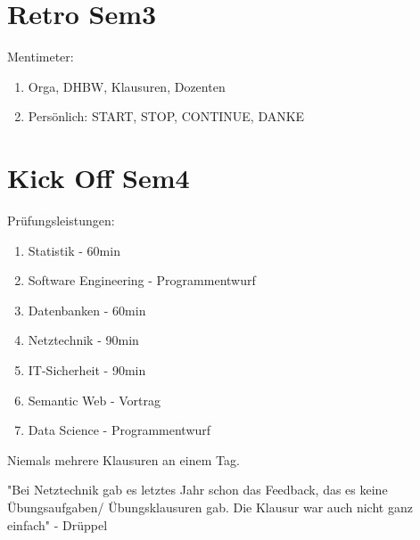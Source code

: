 \documentclass[a4paper]{article}
\title{\docTitle}
\author{Moritz}
\date{\today}
\begin{document}
\maketitle
\tableofcontents


\section{Retro Sem3}

Mentimeter:

\begin{enumerate}
    \item Orga, DHBW, Klausuren, Dozenten
    \item Persönlich: START, STOP, CONTINUE, DANKE
\end{enumerate}

\section{Kick Off Sem4}

Prüfungsleistungen:

\begin{enumerate}
    \item Statistik - 60min
    \item Software Engineering - Programmentwurf
    \item Datenbanken - 60min
    \item Netztechnik - 90min
    \item IT-Sicherheit - 90min
    \item Semantic Web - Vortrag
    \item Data Science - Programmentwurf
\end{enumerate}

Niemals mehrere Klausuren an einem Tag.

"Bei Netztechnik gab es letztes Jahr schon das Feedback, das es keine Übungsaufgaben/ Übungsklausuren gab. Die Klausur war auch nicht ganz einfach" - Drüppel
\end{document}
